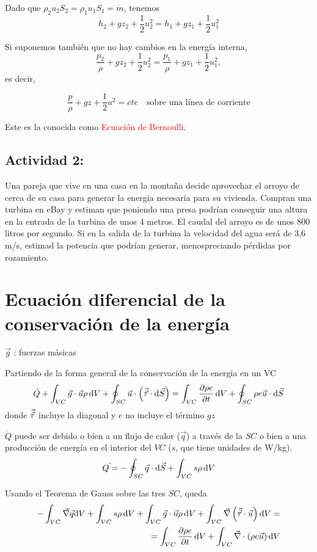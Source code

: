 	Dado que $\rho_{2}u_{2}S_{2}=\rho_{1}u_{1}S_{1}=\dot{m}$, tenemos
	\[
	h_{2}+gz_{2}+\frac{1}{2}u_{2}^{2}=h_{1}+gz_{1}+\frac{1}{2}u_{1}^{2}
	\]
	
	Si suponemos también que no hay cambios en la energía interna, 
	\[
	\frac{p_{2}}{\rho}+gz_{2}+\frac{1}{2}u_{2}^{2}=\frac{p_{1}}{\rho}+gz_{1}+\frac{1}{2}u_{1}^{2},
	\]
	es decir, 
	
	\begin{equation}
		\frac{p}{\rho}+gz+\frac{1}{2}u^{2}=cte\quad\text{sobre una línea de corriente}
	\end{equation}
	
	
	Este es la conocida como \textcolor{red}{Ecuación de Bernoulli}.



	
	\subsection*{Actividad 2:}
		Una pareja que vive en una casa en la montaña decide aprovechar el
		arroyo de cerca de su casa para generar la energia necesaria para
		su vivienda. Compran una turbina en eBay y estiman que poniendo una
		presa podrían conseguir una altura en la entrada de la turbina de
		unos 4 metros. El caudal del arroyo es de unos 800 litros por segundo.
		Si en la salida de la turbina la velocidad del agua será de 3,6 m/s,
		estimad la potencia que podrían generar, menospreciando pérdidas por
		rozamiento.


\section{Ecuación diferencial de la conservación de la energía}

	
	$\vec{g}$ : fuerzas másicas
	
	Partiendo de la forma general de la conservación de la energia en
	un VC 
	\[
	\dot{Q}+\int_{VC}\vec{g}\cdot\vec{u}\rho\,\text{d} V+\oint_{SC}\vec{u}\cdot\left(\vec{\vec \tau}\cdot\text{d}\vec{S}\right)=\int_{VC}\frac{\partial \rho e}{\partial t}\,\text{d} V+\oint_{SC}\rho e\vec{u}\cdot\text{d}\vec{S}
	\]
	donde $\vec{\vec \tau}$ incluye la diagonal y $e$ no incluye el término $gz$ 
	
	
	$\dot{Q}$ puede ser debido o bien a un flujo de calor ($\vec{q}$)
	a través de la $SC$ o bien a una producción de energía en el interior
	del $VC$ ($s$, que tiene unidades de W/kg). 
	\[
	\dot{Q=}-\oint_{SC}\vec{q}\cdot\text{d}\vec{S}+\int_{VC}s\rho\,\text{d} V
	\]
	

	
	Usando el Teorema de Gauss sobre las tres $SC$, queda 
	\begin{eqnarray*}
		-\int_{VC}\vec{\nabla}\vec{q}\text{d} V+\int_{VC}s\rho\,\text{d} V+\int_{VC}\vec{g}\cdot\vec{u}\rho\,\text{d} V+\int_{VC}\vec{\nabla}\left(\vec{\vec \tau}\cdot\vec{u}\right)\text{d} V=\\
		=\int_{VC}\frac{\partial \rho e}{\partial t}\,\text{d} V+\int_{VC}\vec{\nabla}\cdot\left(\rho e\vec{u}\right)\text{d} V
	\end{eqnarray*}
	
